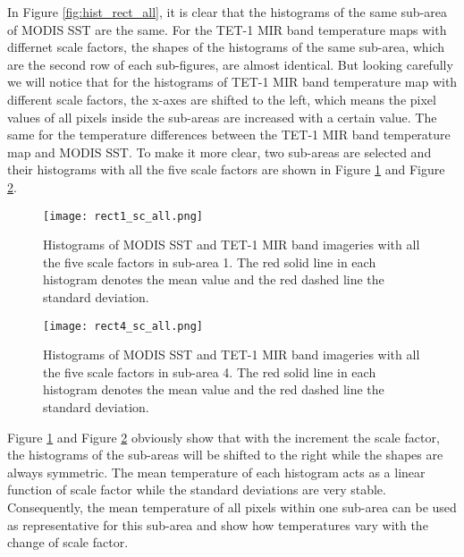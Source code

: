 \noindent In Figure \ref{fig:hist_rect_all}, it is clear that the histograms of the same sub-area of MODIS SST are the same. For the TET-1 MIR band temperature maps with differnet scale factors, the shapes of the histograms of the same sub-area, which are the second row of each sub-figures, are almost identical. But looking carefully we will notice that for the histograms of TET-1 MIR band temperature map with different scale factors, the x-axes are shifted to the left, which means the pixel values of all pixels inside the sub-areas are increased with a certain value. The same for the temperature differences between the TET-1 MIR band temperature map and MODIS SST. To make it more clear, two sub-areas are selected and their histograms with all the five scale factors are shown in Figure \ref{fig:rect1_sc_all} and Figure \ref{fig:rect4_sc_all}.\\

\begin{figure}[!htbp]
\centering
\texttt{[image: rect1\_sc\_all.png]}
\caption{Histograms of MODIS SST and TET-1 MIR band imageries with all the five scale factors in sub-area 1. The red solid line in each histogram denotes the mean value and the red dashed line the standard deviation.}
\label{fig:rect1_sc_all}
\end{figure}

\begin{figure}[!htbp]
\centering
\texttt{[image: rect4\_sc\_all.png]}
\caption{Histograms of MODIS SST and TET-1 MIR band imageries with all the five scale factors in sub-area 4. The red solid line in each histogram denotes the mean value and the red dashed line the standard deviation.}
\label{fig:rect4_sc_all}
\end{figure}

\noindent Figure \ref{fig:rect1_sc_all} and Figure \ref{fig:rect4_sc_all} obviously show that with the increment the scale factor, the histograms of the sub-areas will be shifted to the right while the shapes are always symmetric. The mean temperature of each histogram acts as a linear function of scale factor while the standard deviations are very stable. Consequently, the mean temperature of all pixels within one sub-area can be used as representative for this sub-area and show how temperatures vary with the change of scale factor.\\

